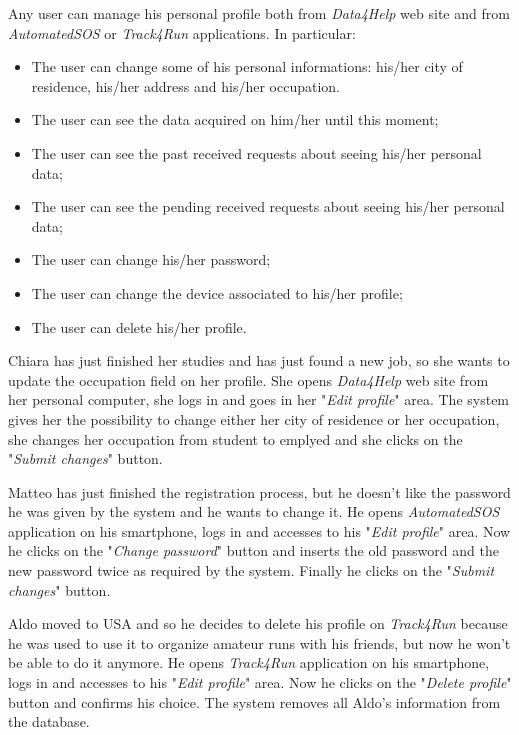 Any user can manage his personal profile both from \textit{Data4Help} web site and from \textit{AutomatedSOS} or \textit{Track4Run} applications. In particular:
\begin{itemize}
  \item The user can change some of his personal informations: his/her city of residence, his/her address and his/her occupation.
  \item The user can see the data acquired on him/her until this moment;
  \item The user can see the past received requests about seeing his/her personal data;
  \item The user can see the pending received requests about seeing his/her personal data;
  \item The user can change his/her password;
  \item The user can change the device associated to his/her profile;
  \item The user can delete his/her profile.
\end{itemize}

Chiara has just finished her studies and has just found a new job, so she wants to update the occupation field on her profile. She opens \textit{Data4Help} web site from her personal computer, she logs in and goes in her "\textit{Edit profile}" area. The system gives her the possibility to change either her city of residence or her occupation, she changes her occupation from student to emplyed and she clicks on the "\textit{Submit changes}" button.

Matteo has just finished the registration process, but he doesn't like the password he was given by the system and he wants to change it. He opens \textit{AutomatedSOS} application on his smartphone, logs in and accesses to his "\textit{Edit profile}" area. Now he clicks on the "\textit{Change password}" button and inserts the old password and the new password twice as required by the system. Finally he clicks on the "\textit{Submit changes}" button.

Aldo moved to USA and so he decides to delete his profile on \textit{Track4Run} because he was used to use it to organize amateur runs with his friends, but now he won't be able to do it anymore. He opens \textit{Track4Run} application on his smartphone, logs in and accesses to his "\textit{Edit profile}" area. Now he clicks on the "\textit{Delete profile}" button and confirms his choice. The system removes all Aldo's information from the database.

